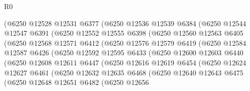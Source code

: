 \begin{lexlean}{R0}
\begin{coremodule}
                (@6250
                  @12528
                  @12531
                  @6377
                  (@6250
                    @12536
                    @12539
                    @6384
                    (@6250
                      @12544
                      @12547
                      @6391
                      (@6250
                        @12552
                        @12555
                        @6398
                        (@6250
                          @12560
                          @12563
                          @6405
                          (@6250
                            @12568
                            @12571
                            @6412
                            (@6250
                              @12576
                              @12579
                              @6419
                              (@6250
                                @12584
                                @12587
                                @6426
                                (@6250
                                  @12592
                                  @12595
                                  @6433
                                  (@6250
                                    @12600
                                    @12603
                                    @6440
                                    (@6250
                                      @12608
                                      @12611
                                      @6447
                                      (@6250
                                        @12616
                                        @12619
                                        @6454
                                        (@6250
                                          @12624
                                          @12627
                                          @6461
                                          (@6250
                                            @12632
                                            @12635
                                            @6468
                                            (@6250
                                              @12640
                                              @12643
                                              @6475
                                              (@6250
                                                @12648
                                                @12651
                                                @6482
                                                (@6250
                                                  @12656

\end{coremodule}
\end{lexlean}
